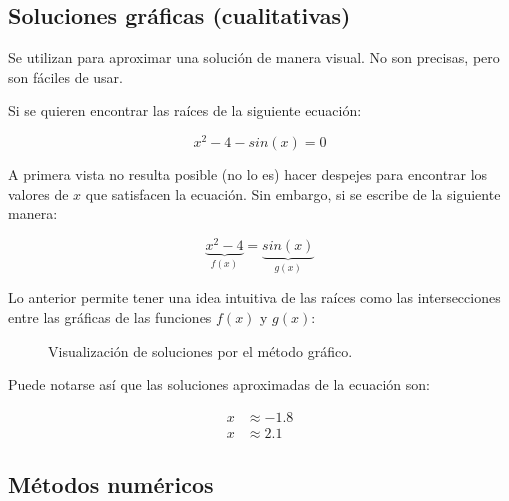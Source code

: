 \subsection{Soluciones gráficas (cualitativas)}

Se utilizan para aproximar una solución de manera visual. No son precisas, pero
son fáciles de usar.

\begin{eg}
    Si se quieren encontrar las raíces de la siguiente
    ecuación:

    \begin{equation}\label{primer-problema}
        x^2 - 4 - sin(x) = 0
    \end{equation}

    A primera vista no resulta posible (no lo es) hacer despejes para
    encontrar los valores de \(x\) que satisfacen la ecuación. Sin embargo,
    si se escribe de la siguiente manera:

    \[
        \underbrace{x^2 - 4}_{f(x)} = \underbrace{sin(x)}_{g(x)}
    \]

    Lo anterior permite tener una idea intuitiva de las raíces como las
    intersecciones entre las gráficas de las funciones \(f(x)\) y \(g(x)\):

    \begin{figure}[H]
        \centering
        \caption{Visualización de soluciones por el método gráfico.}
    \end{figure}

    Puede notarse así que las soluciones aproximadas de la ecuación son:

    \begin{align*}
        x & \approx -1.8 \\
        x & \approx 2.1
    \end{align*}

\end{eg}

\subsection{Métodos numéricos}

